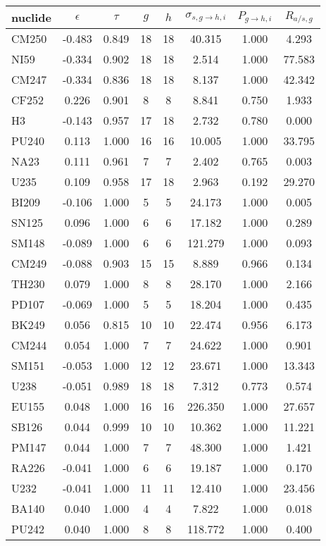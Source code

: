 \begin{tabular}{|l|ccccccc|}
\hline
nuclide & $\epsilon$ & $\tau$ & $g$ & $h$ & $\sigma_{s,g\to h,i}$ & $P_{g\to h,i}$ & $R_{a/s,g}$\\
\hline
CM250 & -0.483 & 0.849 & 18 & 18 & 40.315 & 1.000 & 4.293\\
NI59 & -0.334 & 0.902 & 18 & 18 & 2.514 & 1.000 & 77.583\\
CM247 & -0.334 & 0.836 & 18 & 18 & 8.137 & 1.000 & 42.342\\
CF252 & 0.226 & 0.901 & 8 & 8 & 8.841 & 0.750 & 1.933\\
H3 & -0.143 & 0.957 & 17 & 18 & 2.732 & 0.780 & 0.000\\
PU240 & 0.113 & 1.000 & 16 & 16 & 10.005 & 1.000 & 33.795\\
NA23 & 0.111 & 0.961 & 7 & 7 & 2.402 & 0.765 & 0.003\\
U235 & 0.109 & 0.958 & 17 & 18 & 2.963 & 0.192 & 29.270\\
BI209 & -0.106 & 1.000 & 5 & 5 & 24.173 & 1.000 & 0.005\\
SN125 & 0.096 & 1.000 & 6 & 6 & 17.182 & 1.000 & 0.289\\
SM148 & -0.089 & 1.000 & 6 & 6 & 121.279 & 1.000 & 0.093\\
CM249 & -0.088 & 0.903 & 15 & 15 & 8.889 & 0.966 & 0.134\\
TH230 & 0.079 & 1.000 & 8 & 8 & 28.170 & 1.000 & 2.166\\
PD107 & -0.069 & 1.000 & 5 & 5 & 18.204 & 1.000 & 0.435\\
BK249 & 0.056 & 0.815 & 10 & 10 & 22.474 & 0.956 & 6.173\\
CM244 & 0.054 & 1.000 & 7 & 7 & 24.622 & 1.000 & 0.901\\
SM151 & -0.053 & 1.000 & 12 & 12 & 23.671 & 1.000 & 13.343\\
U238 & -0.051 & 0.989 & 18 & 18 & 7.312 & 0.773 & 0.574\\
EU155 & 0.048 & 1.000 & 16 & 16 & 226.350 & 1.000 & 27.657\\
SB126 & 0.044 & 0.999 & 10 & 10 & 10.362 & 1.000 & 11.221\\
PM147 & 0.044 & 1.000 & 7 & 7 & 48.300 & 1.000 & 1.421\\
RA226 & -0.041 & 1.000 & 6 & 6 & 19.187 & 1.000 & 0.170\\
U232 & -0.041 & 1.000 & 11 & 11 & 12.410 & 1.000 & 23.456\\
BA140 & 0.040 & 1.000 & 4 & 4 & 7.822 & 1.000 & 0.018\\
PU242 & 0.040 & 1.000 & 8 & 8 & 118.772 & 1.000 & 0.400\\

\end{tabular}
